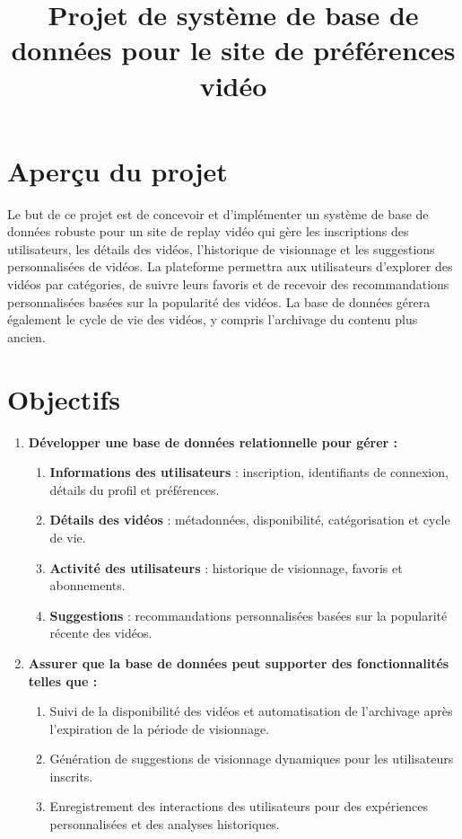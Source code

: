 \documentclass[a4paper, 12pt]{article}
\title{Projet de système de base de données pour le site de préférences vidéo}
\author{}
\date{}
\begin{document}
\maketitle

\section*{Aperçu du projet}

Le but de ce projet est de concevoir et d'implémenter un système de base de données robuste pour un site de replay vidéo qui gère les inscriptions des utilisateurs, les détails des vidéos, l'historique de visionnage et les suggestions personnalisées de vidéos. La plateforme permettra aux utilisateurs d'explorer des vidéos par catégories, de suivre leurs favoris et de recevoir des recommandations personnalisées basées sur la popularité des vidéos. La base de données gérera également le cycle de vie des vidéos, y compris l'archivage du contenu plus ancien.

\section*{Objectifs}

\begin{enumerate}
    \item \textbf{Développer une base de données relationnelle pour gérer :}
    \begin{enumerate}
        \item \textbf{Informations des utilisateurs} : inscription, identifiants de connexion, détails du profil et préférences.
        \item \textbf{Détails des vidéos} : métadonnées, disponibilité, catégorisation et cycle de vie.
        \item \textbf{Activité des utilisateurs} : historique de visionnage, favoris et abonnements.
        \item \textbf{Suggestions} : recommandations personnalisées basées sur la popularité récente des vidéos.
    \end{enumerate}
    \item \textbf{Assurer que la base de données peut supporter des fonctionnalités telles que :}
    \begin{enumerate}
        \item Suivi de la disponibilité des vidéos et automatisation de l'archivage après l'expiration de la période de visionnage.
        \item Génération de suggestions de visionnage dynamiques pour les utilisateurs inscrits.
        \item Enregistrement des interactions des utilisateurs pour des expériences personnalisées et des analyses historiques.
    \end{enumerate}
\end{enumerate}
\end{document}

